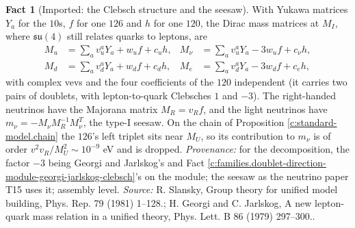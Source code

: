 \documentclass[11pt]{article}
\theoremstyle{definition}
\newtheorem{fact}[theorem]{Fact}
\theoremstyle{plain}
\providecommand{\su}{}\renewcommand{\su}{\mathfrak{su}}
\begin{document}
\begin{fact}[Imported: the Clebsch structure and the seesaw]\label{c:standard-model.imported-clebsch-structure-seesaw}
With Yukawa matrices $Y_{a}$ for the $10$s, $f$ for one $126$ and $h$ for one $120$, the Dirac mass matrices at $M_{I}$, where $\su(4)$ still relates quarks to leptons, are
\begin{align*}
M_{u} &= \textstyle\sum_{a} v^{a}_{u}Y_{a} + w_{u}f + c_{u}h, & M_{\nu} &= \textstyle\sum_{a} v^{a}_{u}Y_{a} - 3w_{u}f + c_{\nu}h, \\
M_{d} &= \textstyle\sum_{a} v^{a}_{d}Y_{a} + w_{d}f + c_{d}h, & M_{e} &= \textstyle\sum_{a} v^{a}_{d}Y_{a} - 3w_{d}f + c_{e}h,
\end{align*}
with complex vevs and the four coefficients of the $120$ independent (it carries two pairs of doublets, with lepton-to-quark Clebsches $1$ and $-3$). The right-handed neutrinos have the Majorana matrix $M_{R} = v_{R}f$, and the light neutrinos have $m_{\nu} = -M_{\nu}M_{R}^{-1}M_{\nu}^{T}$, the type-I seesaw. On the chain of Proposition \ref{c:standard-model.chain} the $126$'s left triplet sits near $M_{U}$, so its contribution to $m_{\nu}$ is of order $v^{2}v_{R}/M_{U}^{2} \sim 10^{-9}$ eV and is dropped. \emph{Provenance:} \cite{Slansky1981} for the decomposition, the factor $-3$ being Georgi and Jarlskog's \cite{GeorgiJarlskog1979} and Fact \ref{c:families.doublet-direction-module-georgi-jarlskog-clebsch}'s on the module; the seesaw as the neutrino paper T15 \cite{ButlerT15} uses it; assembly level.
\emph{Source:} R. Slansky, Group theory for unified model building, Phys. Rep. 79 (1981) 1--128.; H. Georgi and C. Jarlskog, A new lepton-quark mass relation in a unified theory, Phys. Lett. B 86 (1979) 297--300..
\end{fact}
\end{document}
